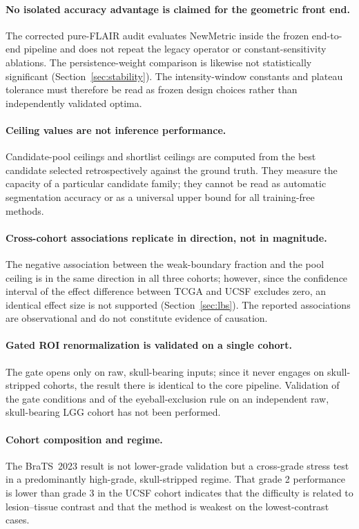 \documentclass[11pt,a4paper]{article}
\begin{document}
\paragraph{No isolated accuracy advantage is claimed for the geometric front end.}
The corrected pure-FLAIR audit evaluates NewMetric inside the frozen end-to-end
pipeline and does not repeat the legacy operator or constant-sensitivity ablations.
The persistence-weight comparison is likewise not statistically significant
(Section~\ref{sec:stability}). The intensity-window constants and plateau tolerance
must therefore be read as frozen design choices rather than independently validated
optima.

\paragraph{Ceiling values are not inference performance.} Candidate-pool ceilings
and shortlist ceilings are computed from the best candidate selected
retrospectively against the ground truth. They measure the capacity of a particular
candidate family; they cannot be read as automatic segmentation accuracy or as a
universal upper bound for all training-free methods.

\paragraph{Cross-cohort associations replicate in direction, not in magnitude.} The
negative association between the weak-boundary fraction and the pool ceiling is in
the same direction in all three cohorts; however, since the confidence interval of
the effect difference between TCGA and UCSF excludes zero, an identical effect size
is not supported (Section~\ref{sec:lbs}). The reported associations are
observational and do not constitute evidence of causation.

\paragraph{Gated ROI renormalization is validated on a single cohort.} The gate
opens only on raw, skull-bearing inputs; since it never engages on skull-stripped
cohorts, the result there is identical to the core pipeline. Validation of the gate
conditions and of the eyeball-exclusion rule on an independent raw, skull-bearing
LGG cohort has not been performed.

\paragraph{Cohort composition and regime.} The BraTS~2023 result is not lower-grade
validation but a cross-grade stress test in a predominantly high-grade,
skull-stripped regime. That grade 2 performance is lower than grade 3 in the UCSF
cohort indicates that the difficulty is related to lesion--tissue contrast and that
the method is weakest on the lowest-contrast cases.
\end{document}
